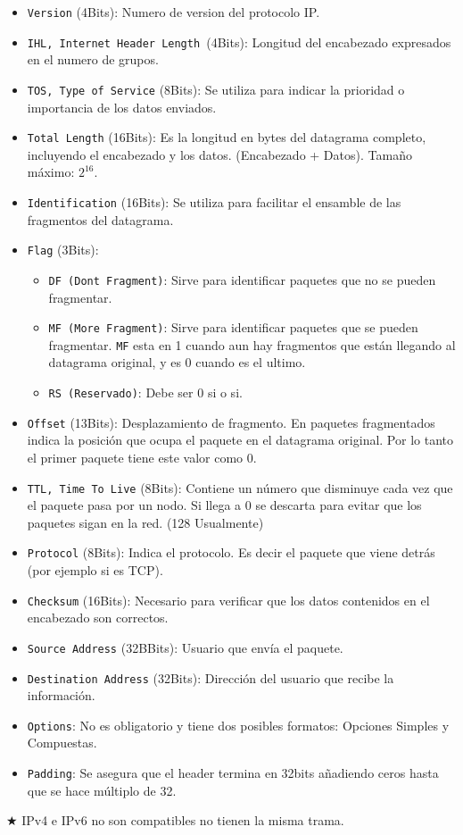 \begin{itemize}
\item \texttt{Version} (4Bits): Numero de version del protocolo IP.
\item \texttt{IHL, Internet Header Length }(4Bits): Longitud del encabezado expresados en el numero de grupos.
\item \texttt{TOS, Type of Service} (8Bits): Se utiliza para indicar la prioridad o importancia de los datos enviados.
\item \texttt{Total Length} (16Bits): Es la longitud en bytes del datagrama completo, incluyendo el encabezado y los datos. (Encabezado + Datos). Tamaño máximo: $2^{16}$.
\item \texttt{Identification} (16Bits): Se utiliza para facilitar el ensamble de las fragmentos del datagrama.
\item \texttt{Flag} (3Bits):
\begin{itemize}
\item \texttt{DF (Dont Fragment)}: Sirve para identificar paquetes que no se pueden fragmentar.
\item \texttt{MF (More Fragment)}: Sirve para identificar paquetes que se pueden fragmentar. \texttt{MF} esta en 1 cuando aun hay fragmentos que están llegando al datagrama original, y es 0 cuando es el ultimo.
\item \texttt{RS (Reservado)}: Debe ser 0 si o si.
\end{itemize}
\item \texttt{Offset} (13Bits):  Desplazamiento de fragmento. En paquetes fragmentados indica la posición que ocupa el paquete en el datagrama original. Por lo tanto el primer paquete tiene este valor como 0.
\item \texttt{TTL, Time To Live} (8Bits): Contiene un número que disminuye cada vez que el paquete pasa por un nodo. Si llega a 0 se descarta para evitar que los paquetes sigan en la red. (128 Usualmente)
\item \texttt{Protocol} (8Bits): Indica el protocolo. Es decir el paquete que viene detrás (por ejemplo si es TCP).
\item \texttt{Checksum} (16Bits): Necesario para verificar que los datos contenidos en el encabezado son correctos.
\item \texttt{Source Address} (32BBits): Usuario que envía el paquete.
\item \texttt{Destination Address} (32Bits): Dirección del usuario que recibe la información.
\item \texttt{Options}: No es obligatorio y tiene dos posibles formatos: Opciones Simples y Compuestas.
\item \texttt{Padding}: Se asegura que el header termina en 32bits añadiendo ceros hasta que se hace múltiplo de 32.
\end{itemize}                
$\bigstar$ IPv4 e IPv6 no son compatibles no tienen la misma trama.            
                
